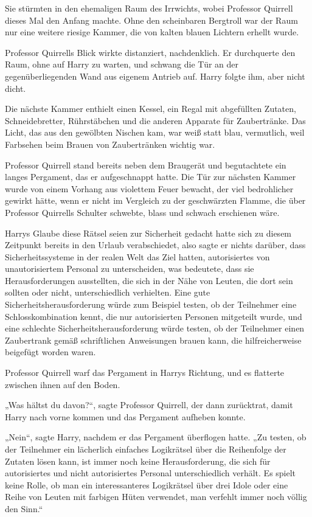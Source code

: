 {Sie stürmten in den ehemaligen Raum des Irrwichts, wobei Professor Quirrell dieses Mal den Anfang machte. Ohne den scheinbaren Bergtroll war der Raum nur eine weitere riesige Kammer, die von kalten blauen Lichtern erhellt wurde.

Professor Quirrells Blick wirkte distanziert, nachdenklich. Er durchquerte den Raum, ohne auf Harry zu warten, und schwang die Tür an der gegenüberliegenden Wand aus eigenem Antrieb auf. Harry folgte ihm, aber nicht dicht.

Die nächste Kammer enthielt einen Kessel, ein Regal mit abgefüllten Zutaten, Schneidebretter, Rührstäbchen und die anderen Apparate für Zaubertränke. Das Licht, das aus den gewölbten Nischen kam, war weiß statt blau, vermutlich, weil Farbsehen beim Brauen von Zaubertränken wichtig war.

Professor Quirrell stand bereits neben dem Braugerät und begutachtete ein langes Pergament, das er aufgeschnappt hatte. Die Tür zur nächsten Kammer wurde von einem Vorhang aus violettem Feuer bewacht, der viel bedrohlicher gewirkt hätte, wenn er nicht im Vergleich zu der geschwärzten Flamme, die über Professor Quirrells Schulter schwebte, blass und schwach erschienen wäre.

Harrys Glaube diese Rätsel seien zur Sicherheit gedacht hatte sich zu diesem Zeitpunkt bereits in den Urlaub verabschiedet, also sagte er nichts darüber, dass Sicherheitssysteme in der realen Welt das Ziel hatten, autorisiertes von unautorisiertem Personal zu unterscheiden, was bedeutete, dass sie Herausforderungen ausstellten, die sich in der Nähe von Leuten, die dort sein sollten oder nicht, unterschiedlich verhielten. Eine gute Sicherheitsherausforderung würde zum Beispiel testen, ob der Teilnehmer eine Schlosskombination kennt, die nur autorisierten Personen mitgeteilt wurde, und eine schlechte Sicherheitsherausforderung würde testen, ob der Teilnehmer einen Zaubertrank gemäß schriftlichen Anweisungen brauen kann, die hilfreicherweise beigefügt worden waren.

Professor Quirrell warf das Pergament in Harrys Richtung, und es flatterte zwischen ihnen auf den Boden.

„Was hältst du davon?“, sagte Professor Quirrell, der dann zurücktrat, damit Harry nach vorne kommen und das Pergament aufheben konnte.

„Nein“, sagte Harry, nachdem er das Pergament überflogen hatte. „Zu testen, ob der Teilnehmer ein lächerlich einfaches Logikrätsel über die Reihenfolge der Zutaten lösen kann, ist immer noch keine Herausforderung, die sich für autorisiertes und nicht autorisiertes Personal unterschiedlich verhält. Es spielt keine Rolle, ob man ein interessanteres Logikrätsel über drei Idole oder eine Reihe von Leuten mit farbigen Hüten verwendet, man verfehlt immer noch völlig den Sinn.“

}
